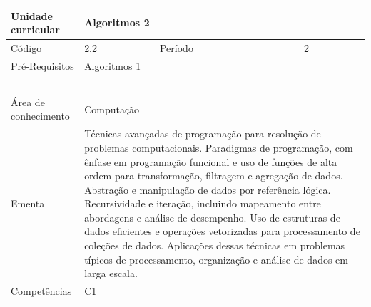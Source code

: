 \clearpage
\newpage

\begin{quadro}[ht!]
  \centering\scriptsize
\caption{Unidade Curricular Algoritmos 2}

\begin{tabular}{|p{2.5cm}|p{2.5cm}|p{2.5cm}|p{2.5cm}|p{2.5cm}|}\hline

  Unidade curricular & \multicolumn{4}{p{10cm}|}{ Algoritmos 2 }\\\hline
  Código & 2.2 & Período & \multicolumn{2}{p{5cm}|}{ 2 }\\\hline
  Pré-Requisitos & \multicolumn{4}{p{10cm}|}{ Algoritmos 1 } \\\hline
  \cellcolor{blue1}{ CH PRESENCIAL } &
    \cellcolor{blue1}{CH EAD Síncrona} &
    \cellcolor{blue1}{CH EAD Síncrona Mediada} &
    \cellcolor{blue1}{CH EAD Assíncrona} &
    \cellcolor{blue1}{CH APCC} \\\hline
  \cellcolor{blue1}{ 60 } &
    \cellcolor{blue1}{ 0 } &
    \cellcolor{blue1}{ 0 } &
    \cellcolor{blue1}{ 30 } &
    \cellcolor{blue1}{0} \\\hline
  \cellcolor{blue1}{ CH Teórica } &
    \cellcolor{blue1}{CH Prática} &
    \cellcolor{blue1}{CH Humanidades} &
    \cellcolor{blue1}{CH Extensão} &
    \cellcolor{blue1}{CH EAD TOTAL} \\\hline
  \cellcolor{blue1}{ 45 } &
    \cellcolor{blue1}{ 45 } &
    \cellcolor{blue1}{ 0 } &
    \cellcolor{blue1}{ 0 } &
    \cellcolor{blue1}{ 30 } \\\hline
  \cellcolor{blue1}{CARGA-HORÁRIA TOTAL} & \multicolumn{4}{p{10cm}|}{ \cellcolor{blue1}{ 90 } } \\\hline
  Área de conhecimento & \multicolumn{4}{p{10cm}|}{ Computação } \\\hline
  Ementa & \multicolumn{4}{p{10cm}|}{ Técnicas avançadas de programação para resolução de problemas computacionais. Paradigmas de programação, com ênfase em programação funcional e uso de funções de alta ordem para transformação, filtragem e agregação de dados. Abstração e manipulação de dados por referência lógica. Recursividade e iteração, incluindo mapeamento entre abordagens e análise de desempenho. Uso de estruturas de dados eficientes e operações vetorizadas para processamento de coleções de dados. Aplicações dessas técnicas em problemas típicos de processamento, organização e análise de dados em larga escala. } \\\hline
  Competências & \multicolumn{4}{p{10cm}|}{ C1 } \\\hline


  
	\end{tabular}

\end{quadro}


